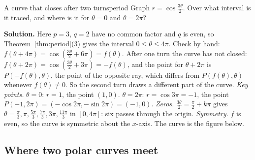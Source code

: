 \documentclass[11pt]{article}
\begin{document}
\begin{exmp}{A curve that closes after two turns}{period}
Graph $r=\cos\frac{3\theta}2$. Over what interval is it traced, and where is it for $\theta=0$ and $\theta=2\pi$?

\textbf{Solution.} Here $p=3$, $q=2$ have no common factor and $q$ is even, so Theorem~\ref{thm:period}(3) gives the interval $0\le\theta\le4\pi$. Check by hand: $f(\theta+4\pi)=\cos\left(\frac{3\theta}2+6\pi\right)=f(\theta)$. After one turn the curve has not closed: $f(\theta+2\pi)=\cos\left(\frac{3\theta}2+3\pi\right)=-f(\theta)$, and the point for $\theta+2\pi$ is $P(-f(\theta),\theta)$, the point of the opposite ray, which differs from $P(f(\theta),\theta)$ whenever $f(\theta)\ne0$. So the second turn draws a different part of the curve. \emph{Key points.} $\theta=0$: $r=1$, the point $(1,0)$. $\theta=2\pi$: $r=\cos3\pi=-1$, the point $P(-1,2\pi)=(-\cos2\pi,-\sin2\pi)=(-1,0)$. \emph{Zeros.} $\frac{3\theta}2=\frac\pi2+k\pi$ gives $\theta=\frac\pi3,\pi,\frac{5\pi}3,\frac{7\pi}3,3\pi,\frac{11\pi}3$ in $[0,4\pi]$: six passes through the origin. \emph{Symmetry.} $f$ is even, so the curve is symmetric about the $x$-axis. The curve is the figure below.
\end{exmp}

\begin{center}
\end{center}

\subsection*{Where two polar curves meet}
\end{document}
